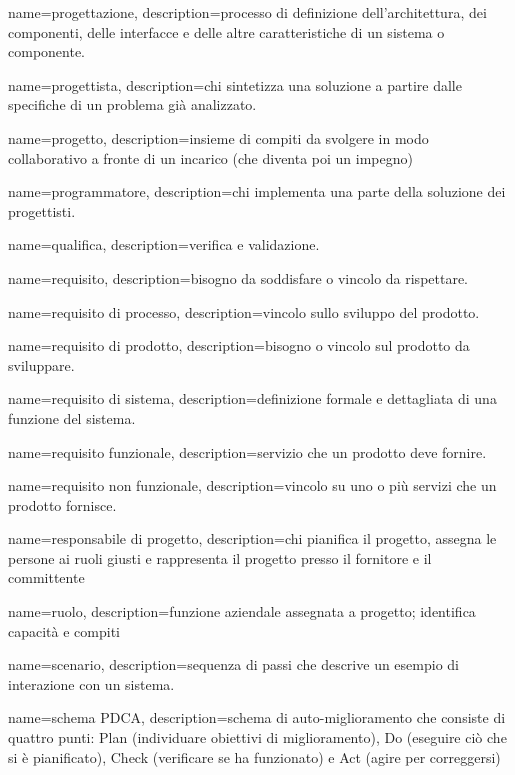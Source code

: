 {
name={progettazione},
description={processo di definizione dell'architettura, dei componenti, delle interfacce e delle altre caratteristiche di un sistema o componente.}
}

{
name={progettista},
description={chi sintetizza una soluzione a partire dalle specifiche di un problema già analizzato.}
}

{
name={progetto},
description={insieme di compiti da svolgere in modo collaborativo a fronte di un incarico (che diventa poi un impegno)}
}

{
name={programmatore},
description={chi implementa una parte della soluzione dei progettisti.}
}

{
name={qualifica},
description={verifica e validazione.}
}

{
name={requisito},
description={bisogno da soddisfare o vincolo da rispettare.}
}

{
name={requisito di processo},
description={vincolo sullo sviluppo del prodotto.}
}

{
name={requisito di prodotto},
description={bisogno o vincolo sul prodotto da sviluppare.}
}

{
name={requisito di sistema},
description={definizione formale e dettagliata di una funzione del sistema.}
}

{
name={requisito funzionale},
description={servizio che un prodotto deve fornire.}
}

{
name={requisito non funzionale},
description={vincolo su uno o più servizi che un prodotto fornisce.}
}

{
name={responsabile di progetto},
description={chi pianifica il progetto, assegna le persone ai ruoli giusti e rappresenta il progetto presso il fornitore e il committente}
}

{
name={ruolo},
description={funzione aziendale assegnata a progetto; identifica capacità e compiti}
}

{
name={scenario},
description={sequenza di passi che descrive un esempio di interazione con un sistema.}
}

{
name={schema PDCA},
description={schema di auto-miglioramento che consiste di quattro punti: Plan (individuare obiettivi di miglioramento), Do (eseguire ciò che si è pianificato), Check (verificare se ha funzionato) e Act (agire per correggersi)}
}

